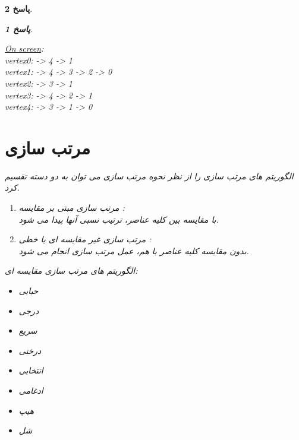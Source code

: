 \documentclass[12pt]{article}
\newtheorem{answer}{پاسخ}[section]
\begin{document}
\begin{answer}
\begin{answer}
\begin{latin}
\begin{minipage}{0.3\textwidth}
\begin{footnotesize}
\underline{On screen}:\\
	vertex0: -> 4 -> 1\\
	vertex1: -> 4 -> 3 -> 2 -> 0\\
	vertex2: -> 3 -> 1\\
	vertex3: -> 4 -> 2 -> 1\\
	vertex4: -> 3 -> 1 -> 0 \\
\end{footnotesize}
	\end{minipage}
\end{latin}

\newpage

\section{مرتب سازی}
الگوریتم های مرتب سازی را از نظر نحوه مرتب سازی می توان به دو دسته تقسیم کرد.
\begin{enumerate}
	\item 
مرتب سازی مبتی بر مقایسه :\\
با مقایسه بین کلیه عناصر، ترتیب نسبی آنها پیدا می شود.
	\item 
مرتب سازی غیر مقایسه ای یا خطی :\\
بدون مقایسه کلیه عناصر با هم، عمل مرتب سازی انجام می شود.
\end{enumerate}

الگوریتم های مرتب سازی مقایسه ای:
\begin{itemize}
	\item حبابی 
	\item درجی  
	\item سریع  
	\item درختی 
	\item انتخابی 
	\item ادغامی 
	\item هیپ 
	\item شل 
\end{itemize}



\end{answer}
\end{answer}
\end{document}
